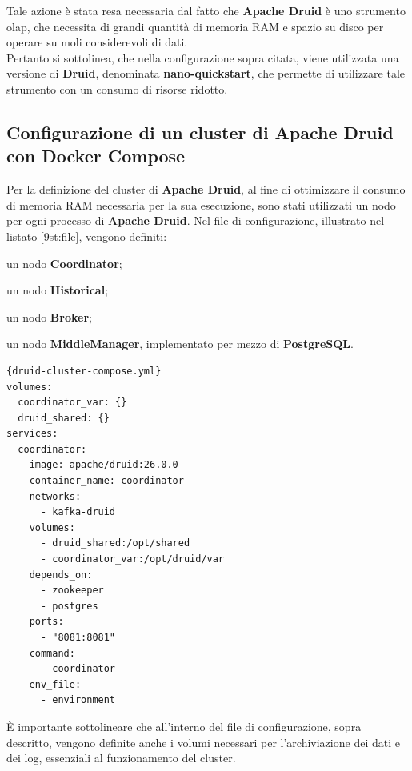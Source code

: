 Tale azione è stata resa necessaria dal fatto che \textbf{Apache Druid} è uno strumento \gls{olap}{}, che necessita di grandi quantità di memoria RAM e spazio su disco per operare 
su moli considerevoli di dati.\\
Pertanto si sottolinea, che nella configurazione sopra citata, viene utilizzata una versione di \textbf{Druid}, denominata \textbf{nano-quickstart}, che permette di utilizzare tale strumento con un consumo di risorse ridotto.
\subsection{Configurazione di un cluster di Apache Druid con Docker Compose}
Per la definizione del \gls{cluster}{} di \textbf{Apache Druid},
al fine di ottimizzare il consumo di memoria RAM necessaria per la sua esecuzione,
sono stati utilizzati un nodo per ogni processo di \textbf{Apache Druid}.
Nel file di configurazione, illustrato nel listato \ref{9st:file}, vengono definiti:
\begin{list}{*}
  \item  un nodo \textbf{Coordinator};
  \item \item  un nodo \textbf{Historical};
  \item  un nodo \textbf{Broker}; 
  \item  un nodo \textbf{MiddleManager}, implementato per mezzo di \textbf{PostgreSQL}.
\end{list} 
\pagebreak
\begin{lstlisting}[caption=\texttt{druid-cluster-compose.yml}, label=9st:file]{druid-cluster-compose.yml}
volumes:
  coordinator_var: {}
  druid_shared: {}
services:
  coordinator:
    image: apache/druid:26.0.0
    container_name: coordinator
    networks:
      - kafka-druid
    volumes:
      - druid_shared:/opt/shared
      - coordinator_var:/opt/druid/var
    depends_on:
      - zookeeper
      - postgres
    ports:
      - "8081:8081"
    command:
      - coordinator
    env_file:
      - environment
\end{lstlisting}
È importante sottolineare che all'interno del file di configurazione, sopra descritto, vengono definite anche 
i \gls{volumi}{} necessari per l'archiviazione dei dati e dei \gls{log}{}, essenziali al funzionamento del \gls{cluster}{}.
